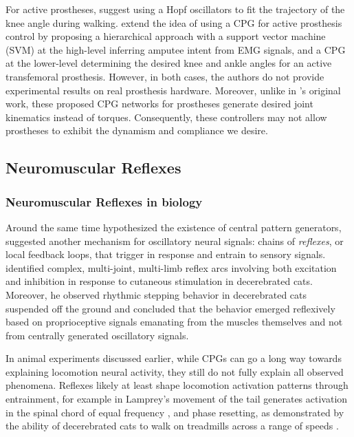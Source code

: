 For active prostheses, \citet{geng2012design} suggest using a Hopf oscillators
to fit the trajectory of the knee angle during walking. \citet{guo2010study}
extend the idea of using a CPG for active prosthesis control by proposing a
hierarchical approach with a support vector machine (SVM) at the high-level
inferring amputee intent from EMG signals, and a CPG at the lower-level
determining the desired knee and ankle angles for an active transfemoral
prosthesis. However, in both cases, the authors do not provide experimental
results on real prosthesis hardware. Moreover, unlike in
\citeauthor{taga1991self}'s original work, these proposed CPG networks for
prostheses generate desired joint kinematics instead of torques. Consequently,
these controllers may not allow prostheses to exhibit the dynamism and
compliance we desire.

\subsection{Neuromuscular Reflexes}\label{sec:back_neuromuscular_reflexes}
\subsubsection{Neuromuscular Reflexes in biology}
Around the same time \citeauthor{brown1911intrinsic} hypothesized the existence
of central pattern generators, \citet{sherrington1910integrative,
sherrington1910flexion} suggested another mechanism for oscillatory neural
signals: chains of \emph{reflexes}, or local feedback loops, that trigger in
response and entrain to sensory signals. \citeauthor{sherrington1910integrative}
identified complex, multi-joint, multi-limb reflex arcs involving both
excitation and inhibition in response to cutaneous stimulation in decerebrated
cats. Moreover, he observed rhythmic stepping behavior in decerebrated cats
suspended off the ground and concluded that the behavior emerged reflexively
based on proprioceptive signals emanating from the muscles themselves and not
from centrally generated oscillatory signals.

In animal experiments discussed earlier, while CPGs can go a long way towards
explaining locomotion neural activity, they still do not fully explain all
observed phenomena. Reflexes likely at least shape locomotion activation
patterns through entrainment, for example in Lamprey's movement of the tail
generates activation in the spinal chord of equal frequency
\citep{mcclellan1993mechanosensory}, and phase resetting, as demonstrated by the
ability of decerebrated cats to walk on treadmills across a range of speeds
\citep{rossignol2000locomotion}.

